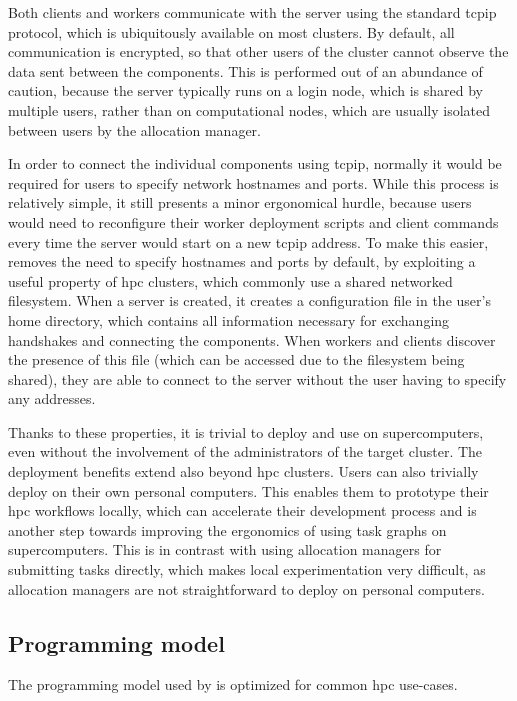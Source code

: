 Both clients and workers communicate with the server using the standard \gls{tcpip}
protocol, which is ubiquitously available on most clusters. By default, all communication is
encrypted, so that other users of the cluster cannot observe the data sent between the
\hyperqueue{} components. This is performed out of an abundance of caution, because the
server typically runs on a login node, which is shared by multiple users, rather than on
computational nodes, which are usually isolated between users by the allocation manager.

In order to connect the individual components using \gls{tcpip}, normally it would be
required for users to specify network hostnames and ports. While this process is relatively simple,
it still presents a minor ergonomical hurdle, because users would need to reconfigure their worker
deployment scripts and client commands every time the server would start on a new
\gls{tcpip} address. To make this easier, \hyperqueue{} removes the need to
specify hostnames and ports by default, by exploiting a useful property of \gls{hpc}
clusters, which commonly use a shared networked filesystem. When a server is created, it creates a
configuration file in the user's home directory, which contains all information necessary for
exchanging handshakes and connecting the components. When workers and clients discover the presence
of this file (which can be accessed due to the filesystem being shared), they are able to connect
to the server without the user having to specify any addresses.

Thanks to these properties, it is trivial to deploy and use \hyperqueue{} on
supercomputers, even without the involvement of the administrators of the target cluster. The
deployment benefits extend also beyond \gls{hpc} clusters. Users can also trivially
deploy \hyperqueue{} on their own personal computers. This enables them to prototype
their \gls{hpc} workflows locally, which can accelerate their development process and
is another step towards improving the ergonomics of using task graphs on supercomputers. This is in
contrast with using allocation managers for submitting tasks directly, which makes local
experimentation very difficult, as allocation managers are not straightforward to deploy on
personal computers.

\subsection{Programming model}
\label{hq:programming-model}
The programming model used by \hyperqueue{} is optimized for common
\gls{hpc} use-cases.

